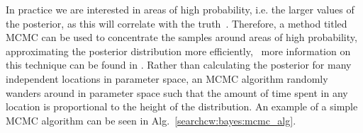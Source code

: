 In practice we are interested in areas of high probability, i.e. the larger
values of the posterior, as this will correlate with the truth~.  Therefore, a method titled \gls{MCMC}
can be used to concentrate the samples around areas of high probability,
approximating the posterior distribution more efficiently,~ more information on
this technique can be found in
\citep{metropolis1953EquationState,vanravenzwaaij2018SimpleIntroduction,sharma2017MarkovChain}.
Rather than calculating the posterior for many independent locations in
parameter space, an \gls{MCMC} algorithm randomly wanders around in parameter
space such that the amount of time spent in any location is proportional to the
height of the distribution.  An example of a simple \gls{MCMC} algorithm can be
seen in Alg.~\ref{searchcw:bayes:mcmc_alg}.

